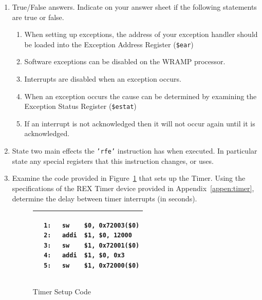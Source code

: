 \documentclass[a4paper,10pt]{article}
\begin{document}
\begin{enumerate}
\item True/False answers. Indicate on your answer sheet if the
following statements are true or false.

\begin{enumerate}

\item When setting up exceptions, the address of your exception
handler should be loaded into the Exception Address Register
(\texttt{\$ear})

\item Software exceptions can be disabled on the WRAMP processor.

\item Interrupts are disabled when an exception occurs.

\item When an exception occurs the cause can be determined by
examining the Exception Status Register (\texttt{\$estat})

\item If an interrupt is not acknowledged then it will not occur again
until it is acknowledged.

\end{enumerate}


\item State two main effects the \texttt{'rfe'} instruction has when
executed. In particular state any special registers that this
instruction changes, or uses.


\item Examine the code provided in Figure~\ref{code:timer} that sets
up the Timer. Using the specifications of the REX Timer device
provided in Appendix~\ref{appen:timer}, determine the delay between
timer interrupts (in seconds).

\begin{figure}[h]
\begin{small}
\begin{center}
\begin{tabular}{|p{6cm}|}
\hline
\begin{verbatim}
  1:   sw    $0, 0x72003($0)
  2:   addi  $1, $0, 12000
  3:   sw    $1, 0x72001($0)
  4:   addi  $1, $0, 0x3
  5:   sw    $1, 0x72000($0)
\end{verbatim}
\\ \hline
\end{tabular}
\end{center}
\end{small}
\caption{Timer Setup Code}
\label{code:timer}
\end{figure}


\end{enumerate}
\end{document}
